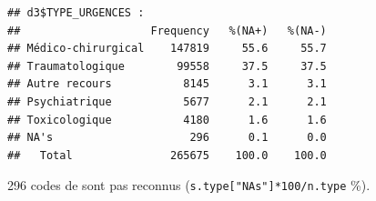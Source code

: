 \documentclass[]{article}
\newenvironment{Shaded}{\begin{snugshade}}{\end{snugshade}}
\newcommand{\KeywordTok}[1]{\textcolor[rgb]{0.13,0.29,0.53}{\textbf{{#1}}}}
\newcommand{\StringTok}[1]{\textcolor[rgb]{0.31,0.60,0.02}{{#1}}}
\newcommand{\NormalTok}[1]{{#1}}
\begin{document}
\begin{verbatim}
## d3$TYPE_URGENCES : 
##                    Frequency   %(NA+)   %(NA-)
## Médico-chirurgical    147819     55.6     55.7
## Traumatologique        99558     37.5     37.5
## Autre recours           8145      3.1      3.1
## Psychiatrique           5677      2.1      2.1
## Toxicologique           4180      1.6      1.6
## NA's                     296      0.1      0.0
##   Total               265675    100.0    100.0
\end{verbatim}

296 codes de sont pas reconnus
(\texttt{s.type{[}"NA\textquotesingle{}s"{]}*100/n.type} \%).

\begin{Shaded}
\end{Shaded}
\end{document}
